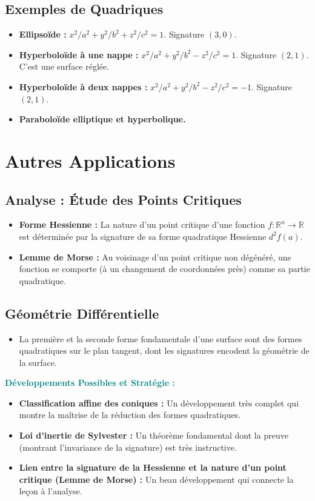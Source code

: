 \documentclass[12pt, a4paper, parskip=full]{report}
\theoremstyle{agregstyle}
\newenvironment{developpements}
  {\par\medskip\noindent\begin{oframed}\noindent\textbf{\textcolor{teal}{Développements Possibles et Stratégie :}}}
  {\end{oframed}\par\medskip}
\begin{document}
\subsection{Exemples de Quadriques}
\begin{itemize}
    \item \textbf{Ellipsoïde :} $x^2/a^2+y^2/b^2+z^2/c^2=1$. Signature $(3,0)$.
    \item \textbf{Hyperboloïde à une nappe :} $x^2/a^2+y^2/b^2-z^2/c^2=1$. Signature $(2,1)$. C'est une surface réglée.
    \item \textbf{Hyperboloïde à deux nappes :} $x^2/a^2+y^2/b^2-z^2/c^2=-1$. Signature $(2,1)$.
    \item \textbf{Paraboloïde elliptique et hyperbolique.}
\end{itemize}

\section{Autres Applications}
\subsection{Analyse : Étude des Points Critiques}
\begin{itemize}
    \item \textbf{Forme Hessienne :} La nature d'un point critique d'une fonction $f: \mathbb{R}^n \to \mathbb{R}$ est déterminée par la signature de sa forme quadratique Hessienne $d^2f(a)$.
    \item \textbf{Lemme de Morse :} Au voisinage d'un point critique non dégénéré, une fonction se comporte (à un changement de coordonnées près) comme sa partie quadratique.
\end{itemize}
\subsection{Géométrie Différentielle}
\begin{itemize}
    \item La première et la seconde forme fondamentale d'une surface sont des formes quadratiques sur le plan tangent, dont les signatures encodent la géométrie de la surface.
\end{itemize}

\begin{developpements}
    \begin{itemize}
        \item \textbf{Classification affine des coniques :} Un développement très complet qui montre la maîtrise de la réduction des formes quadratiques.
        \item \textbf{Loi d'inertie de Sylvester :} Un théorème fondamental dont la preuve (montrant l'invariance de la signature) est très instructive.
        \item \textbf{Lien entre la signature de la Hessienne et la nature d'un point critique (Lemme de Morse) :} Un beau développement qui connecte la leçon à l'analyse.
    \end{itemize}
\end{developpements}
\end{document}
